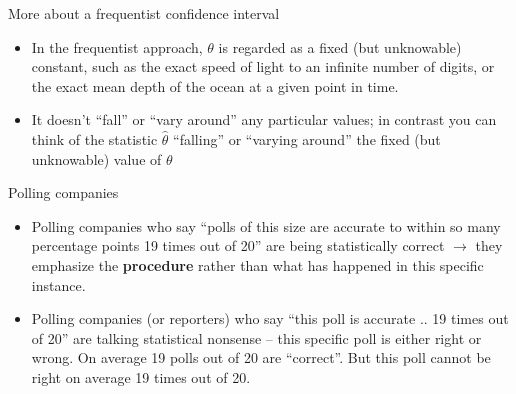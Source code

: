 \documentclass[10pt,handout]{beamer}\usepackage[]{graphicx}\usepackage[]{color}
\begin{document}
\begin{frame}{More about a frequentist confidence interval}
	\begin{itemize}
		\setlength\itemsep{2em}
		\item In the frequentist approach, $\theta$ is regarded as a fixed (but unknowable) constant, such as the exact speed of light to an infinite number of digits, or the exact mean depth of the ocean at a given point in time. \pause
		
		\item It doesn't ``fall'' or ``vary around'' any particular values; in contrast you can think of the statistic $\hat{\theta}$ ``falling'' or ``varying around'' the fixed (but unknowable) value of $\theta$
	\end{itemize}
\end{frame}


\begin{frame}{Polling companies}
	\begin{itemize}
		\setlength\itemsep{2em}
		\item Polling companies who say ``polls of this size are accurate to within so many percentage points 19 times out of 20'' are being statistically correct $\to$ they emphasize the \textbf{procedure} rather than what has happened in this specific instance. 
		\item Polling companies (or reporters) who say ``this poll is accurate .. 19
		times out of 20'' are talking statistical nonsense -- this specific poll is either right or wrong. On average 19 polls out of 20 are ``correct''. But this
		poll cannot be right on average 19 times out of 20.
	\end{itemize}
\end{frame}

\end{document}
